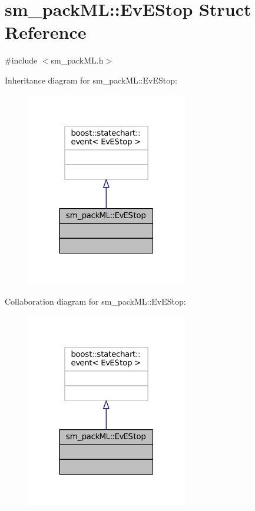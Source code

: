 \hypertarget{structsm__packML_1_1EvEStop}{}\section{sm\+\_\+pack\+ML\+:\+:Ev\+E\+Stop Struct Reference}
\label{structsm__packML_1_1EvEStop}


{\ttfamily \#include $<$sm\+\_\+pack\+M\+L.\+h$>$}



Inheritance diagram for sm\+\_\+pack\+ML\+:\+:Ev\+E\+Stop\+:
\nopagebreak
\begin{figure}[H]
\begin{center}
\leavevmode
\includegraphics[width=199pt]{structsm__packML_1_1EvEStop__inherit__graph}
\end{center}
\end{figure}


Collaboration diagram for sm\+\_\+pack\+ML\+:\+:Ev\+E\+Stop\+:
\nopagebreak
\begin{figure}[H]
\begin{center}
\leavevmode
\includegraphics[width=199pt]{structsm__packML_1_1EvEStop__coll__graph}
\end{center}
\end{figure}


